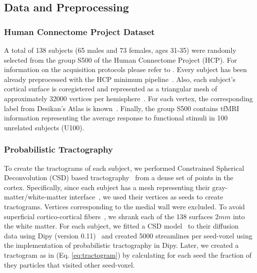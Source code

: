 \subsection{Data and Preprocessing}
%
\subsubsection{Human Connectome Project Dataset}
A total of 138 subjects (65 males and 73 females, ages 31-35) were randomly 
selected from the group S500 of the Human Connectome Project (HCP). For
information on the acquisition protocols please refer to \citet{VanEssen2012}.
Every subject has been already preprocessed with the HCP minimum 
pipeline~\citep{Glasser2013}. Also, each subject's cortical surface is
coregistered and represented as a triangular mesh of approximately 32000
vertices per hemisphere~\citep{Glasser2013}. For each
vertex, the corresponding label from Desikan's Atlas is known~\citep{Desikan2006}.
Finally, the group S500 contains tfMRI information representing the average
response to functional stimuli in 100 unrelated subjects (U100)\citep{Barch2013}.
%
\subsubsection{Probabilistic Tractography}
To create the tractograms of each subject, we performed Constrained Spherical 
Deconvolution (CSD) based tractography~\citep{Tournier2004} from a dense set of
points in the cortex. Specifically, since each subject has a mesh representing
their gray-matter/white-matter interface~\citep{Glasser2013}, we used their
vertices as seeds to create tractograms. Vertices corresponding to the medial
wall were excluded. To avoid superficial cortico-cortical fibers~\citep{Reveley2015},
we shrank each of the 138 surfaces $2mm$ into the white matter. For each subject,
we fitted a CSD model~\citep{Tournier2004} to their diffusion data using Dipy
(version 0.11)~\citep{Garyfallidis2014} and created 5000 streamlines per seed-voxel
using the implementation of probabilistic tractography in Dipy. Later, we
created a tractogram as in (Eq. \ref{eq:tractogram}) by calculating for each
seed the fraction of they particles that visited other seed-voxel.
%
